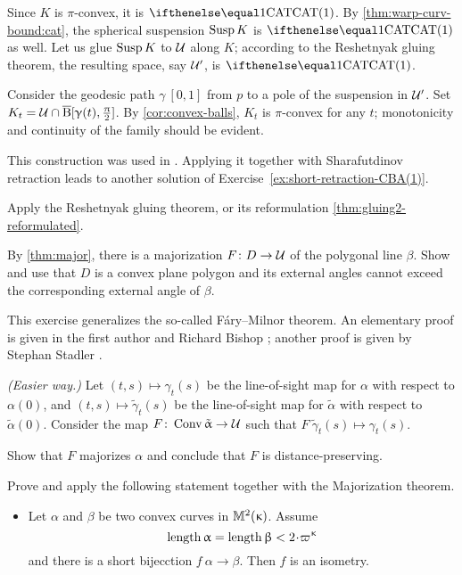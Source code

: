 Since $K$ is $\pi$-convex, it is $\CAT1$.
By \ref{thm:warp-curv-bound:cat}, the spherical suspension $\mathop{\rm Susp}\nolimits K$ is $\CAT1$ as well.
Let us glue $\mathop{\rm Susp}\nolimits K$ to $\mathcal{U}$  along $K$;
according to the Reshetnyak gluing theorem, the resulting space, say $\mathcal{U}'$, is $\CAT1$.

Consider the geodesic path $\gamma\:[0,1]$ from $p$ to a pole of the suspension in $\mathcal{U}'$.
Set $K_t=\spc{U}\cap\cBall[\gamma(t),\tfrac\pi2]$.
By \ref{cor:convex-balls}, $K_t$ is $\pi$-convex for any $t$;
monotonicity and continuity of the family should be evident.

This construction was used in \cite{lytchak-petrunin-2020}.
Applying it together with Sharafutdinov retraction leads to another solution of Exercise~\ref{ex:short-retraction-CBA(1)}.

Apply the Reshetnyak gluing theorem, or its reformulation \ref{thm:gluing2-reformulated}.


 By \ref{thm:major}, there is a majorization $F\:D\to\spc{U}$ of the polygonal line $\beta$.
Show and use that $D$ is a convex plane polygon and its external angles cannot exceed the corresponding external angle of $\beta$.


 This exercise generalizes the so-called Fáry–Milnor theorem.
An elementary proof is given in the first author and Richard Bishop \cite{alexander-bishop:fm};
another proof is given by Stephan Stadler \cite{stadler}.

\textit{(Easier way.)} 
Let 
$(t,s)\mapsto \gamma_t(s)$ be the line-of-sight map 
for $\alpha$ with respect to $\alpha(0)$,
and 
$(t,s)\mapsto \tilde \gamma_t(s)$ be the line-of-sight map 
for $\tilde \alpha$ with respect to $\tilde \alpha(0)$.
Consider the map  $F\:\Conv\tilde \alpha\to \spc{U}$ such that 
$F\:\tilde \gamma_t(s)\mapsto \gamma_t(s)$.

Show that $F$ majorizes $\alpha$
and conclude that $F$ is distance-preserving.

Prove and apply the following statement together with the Majorization theorem.
\begin{itemize}
\item Let $\alpha$ and $\beta$ be two convex curves in $\mathbb{M}_{{}}^{2}({\upkappa})$.
Assume 
\[\length \alpha=\length\beta<2\cdot\varpi\kappa\]
and there is a short bijecction $f\:\alpha\to\beta$.
Then $f$ is an isometry.
\end{itemize}

